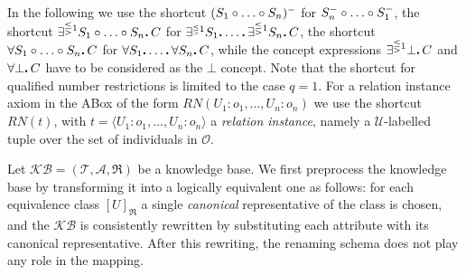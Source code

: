 \documentclass[envcountsame,draft]{llncs}
\newcommand{\nb}[1]{\textcolor{red}{\textdagger}\marginpar{\scriptsize\raggedright\textcolor{red}{#1}}}
\newcommand{\KB}{\ensuremath{\mathcal{KB}}\xspace}
\newcommand{\per}{\mathpunct{\mbox{\bf .}}}
\newcommand{\A}{\ensuremath{\mathcal{A}}\xspace}
\newcommand{\Ob}{\ensuremath{\mathcal{O}}\xspace}
\begin{document}
In the following we use the shortcut $(S_1\circ\ldots\circ S_n)^-$
for $S_n^-\circ\ldots\circ S_1^-$, the shortcut
$\exists^{\lesseqgtr 1} S_1\chain\ldots\chain S_n\per C$ for
$\card{1}{S_1\per\ldots\per\exists^{\lesseqgtr 1} S_n}{C}$, the
shortcut $\forall S_1\chain\ldots\chain S_n\per C$ for
$\forall S_1\per\ldots\per\forall S_n\per {C}$, while\nb{A: changed}
the concept expressions $\exists^{\lesseqgtr 1}\bot\per{C}$ and
$\forall \bot\per {C}$ have to be considered  as the $\bot$ concept.
Note\nb{A: sentence changed, the original is commented} that the
shortcut for qualified number restrictions is limited to the case
$q = 1$.
%
%
For a relation instance axiom in the ABox of the form
$R\!N(U_1\!:\!o_1,\ldots,U_n\!:\!o_n)$ we use the shortcut $R\!N(t)$,
with $t = \langle U_1\!:\!o_1,\ldots,U_n\!:\!o_n\rangle$ a
\emph{relation instance}, namely a $\mathcal{U}$-labelled tuple over
the set of individuals in $\Ob$.

Let $\KB = (\mathcal{T},\A,\Re)$ be a \DLRpm knowledge base.
We first preprocess the \DLRpm knowledge base by transforming it into a logically equivalent one as follows: for each equivalence class $[U]_{\Re}$ a single \emph{canonical} representative of the class is chosen, and the \KB is consistently rewritten by substituting each attribute with its canonical representative. After this rewriting, the renaming schema does not play any role in the mapping.

\end{document}
